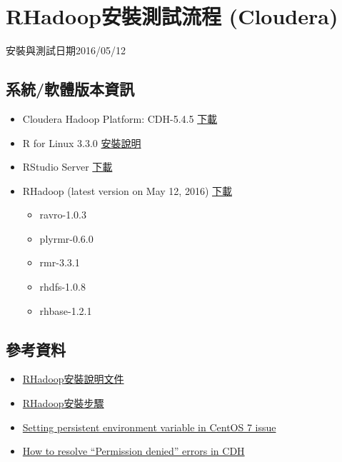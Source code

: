 \documentclass[]{book}
\providecommand{\tightlist}{%
  \setlength{\itemsep}{0pt}\setlength{\parskip}{0pt}}
\theoremstyle{definition}
\theoremstyle{definition}
\theoremstyle{remark}
\begin{document}
\section{RHadoop安裝測試流程 (Cloudera)}\label{rhadoop-cloudera}

安裝與測試日期2016/05/12

\subsection{系統/軟體版本資訊}

\begin{itemize}
\tightlist
\item
  Cloudera Hadoop Platform: CDH-5.4.5
  \href{http://www.cloudera.com/downloads/cdh/5-4-5.html}{下載}
\item
  R for Linux 3.3.0
  \href{https://cran.rstudio.com/bin/linux/redhat/README}{安裝說明}
\item
  RStudio Server
  \href{https://www.rstudio.com/products/rstudio/download-server/}{下載}
\item
  RHadoop (latest version on May 12, 2016)
  \href{https://github.com/RevolutionAnalytics/RHadoop/wiki/Downloads}{下載}

  \begin{itemize}
  \tightlist
  \item
    ravro-1.0.3
  \item
    plyrmr-0.6.0
  \item
    rmr-3.3.1
  \item
    rhdfs-1.0.8
  \item
    rhbase-1.2.1
  \end{itemize}
\end{itemize}

\subsection{參考資料}

\begin{itemize}
\tightlist
\item
  \href{https://github.com/RevolutionAnalytics/RHadoop/wiki/Installing-RHadoop-on-RHEL}{RHadoop安裝說明文件}
\item
  \href{https://bigdatastudy.hackpad.com/ep/pad/static/IADMBeqF0vV}{RHadoop安裝步驟}
\item
  \href{http://unix.stackexchange.com/questions/271514/setting-persistent-environment-variable-in-centos-7-issue}{Setting
  persistent environment variable in CentOS 7 issue}
\item
  \href{https://community.cloudera.com/t5/CDH-Manual-Installation/How-to-resolve-quot-Permission-denied-quot-errors-in-CDH/ta-p/36141}{How
  to resolve ``Permission denied'' errors in CDH}
\end{itemize}
\end{document}
